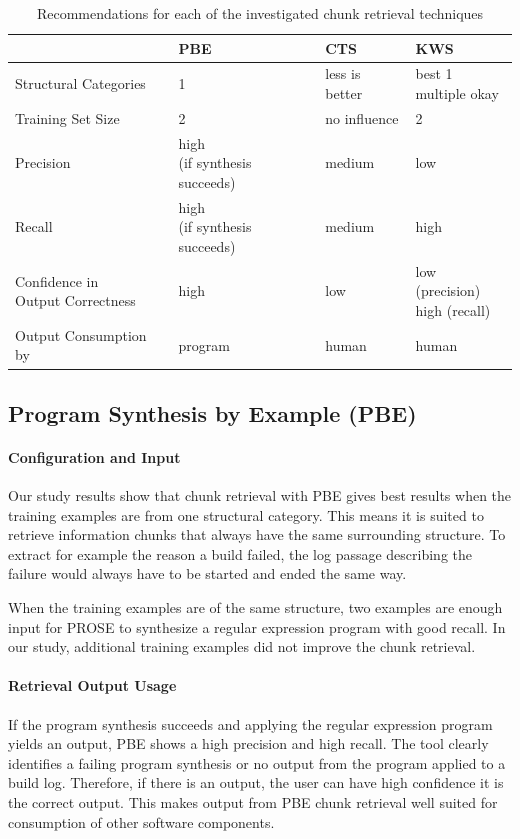 \documentclass[\myrootdir/main.tex]{subfiles}
\begin{document}
\begin{table}[htbp]
\centering
\begin{tabularx}{\textwidth}{@{}llll@{}}
  \toprule
  & PBE & CTS & KWS \\
  \midrule
  Structural Categories & 1 & less is better & \makecell[l]{best 1 \\ multiple okay} \\
  Training Set Size & 2 & no influence & 2 \\ 
  Precision & \makecell[l]{high \\ (if synthesis succeeds)} & medium & low \\ 
  Recall & \makecell[l]{high \\ (if synthesis succeeds)} & medium & high \\ 
  \makecell[l]{Confidence in \\ Output Correctness} & high & low & \makecell[l]{low (precision) \\ high (recall)} \\ 
  Output Consumption by & program & human & human \\ 
  \bottomrule
\end{tabularx}
\caption{Recommendations for each of the investigated chunk retrieval techniques}
\label{tab:single-technique-recommendations}
\end{table}

\subsection{Program Synthesis by Example (PBE)}

\paragraph{Configuration and Input}
Our study results show that chunk retrieval with PBE gives best results when the training examples are from one structural category.
This means it is suited to retrieve information chunks that always have the same surrounding structure.
To extract for example the reason a build failed, the log passage describing the failure would always have to be started and ended the same way.

When the training examples are of the same structure, two examples are enough input for PROSE to synthesize a regular expression program with good recall.
In our study, additional training examples did not improve the chunk retrieval.

\paragraph{Retrieval Output Usage}
If the program synthesis succeeds and applying the regular expression program yields an output, PBE shows a high precision and high recall.
The tool clearly identifies a failing program synthesis or no output from the program applied to a build log.
Therefore, if there is an output, the user can have high confidence it is the correct output.
This makes output from PBE chunk retrieval well suited for consumption of other software components.
\end{document}
